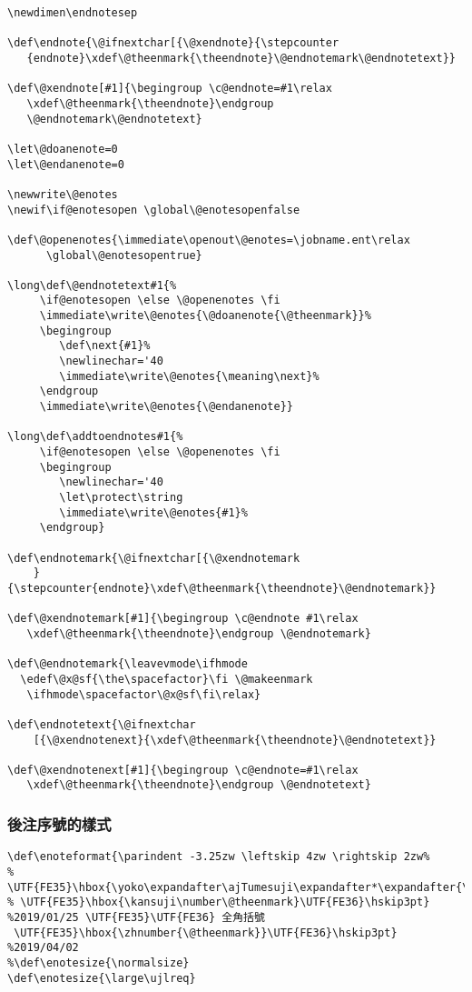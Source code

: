\begin{lstlisting}[firstnumber=1458]
\newdimen\endnotesep

\def\endnote{\@ifnextchar[{\@xendnote}{\stepcounter
   {endnote}\xdef\@theenmark{\theendnote}\@endnotemark\@endnotetext}}

\def\@xendnote[#1]{\begingroup \c@endnote=#1\relax
   \xdef\@theenmark{\theendnote}\endgroup
   \@endnotemark\@endnotetext}

\let\@doanenote=0
\let\@endanenote=0

\newwrite\@enotes
\newif\if@enotesopen \global\@enotesopenfalse

\def\@openenotes{\immediate\openout\@enotes=\jobname.ent\relax
      \global\@enotesopentrue}

\long\def\@endnotetext#1{%
     \if@enotesopen \else \@openenotes \fi
     \immediate\write\@enotes{\@doanenote{\@theenmark}}%
     \begingroup
        \def\next{#1}%
        \newlinechar='40
        \immediate\write\@enotes{\meaning\next}%
     \endgroup
     \immediate\write\@enotes{\@endanenote}}

\long\def\addtoendnotes#1{%
     \if@enotesopen \else \@openenotes \fi
     \begingroup
        \newlinechar='40
        \let\protect\string
        \immediate\write\@enotes{#1}%
     \endgroup}

\def\endnotemark{\@ifnextchar[{\@xendnotemark
    }{\stepcounter{endnote}\xdef\@theenmark{\theendnote}\@endnotemark}}

\def\@xendnotemark[#1]{\begingroup \c@endnote #1\relax
   \xdef\@theenmark{\theendnote}\endgroup \@endnotemark}

\def\@endnotemark{\leavevmode\ifhmode
  \edef\@x@sf{\the\spacefactor}\fi \@makeenmark
   \ifhmode\spacefactor\@x@sf\fi\relax}

\def\endnotetext{\@ifnextchar
    [{\@xendnotenext}{\xdef\@theenmark{\theendnote}\@endnotetext}}

\def\@xendnotenext[#1]{\begingroup \c@endnote=#1\relax
   \xdef\@theenmark{\theendnote}\endgroup \@endnotetext}
\end{lstlisting}



\subsubsection{後注序號的樣式}

\begin{lstlisting}[firstnumber=1510]
%\def\enoteformat{\parindent -1.3zw \leftskip 2.3zw %
\def\enoteformat{\parindent -3.25zw \leftskip 4zw \rightskip 2zw%
% \UTF{FE35}\hbox{\yoko\expandafter\ajTumesuji\expandafter*\expandafter{\number\@theenmark}}\UTF{FE36}}
% \UTF{FE35}\hbox{\kansuji\number\@theenmark}\UTF{FE36}\hskip3pt} %2019/01/25 \UTF{FE35}\UTF{FE36} 全角括號
 \UTF{FE35}\hbox{\zhnumber{\@theenmark}}\UTF{FE36}\hskip3pt} %2019/04/02
%\def\enotesize{\normalsize}
\def\enotesize{\large\ujlreq}
\end{lstlisting}



